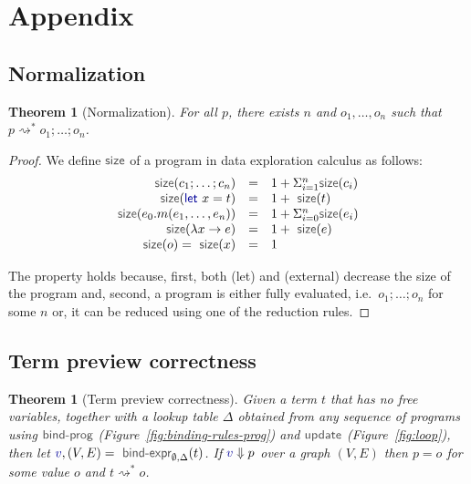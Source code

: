 \documentclass[acmsmall,anonymous,fleqn]{acmart}\settopmatter{printfolios=false,printccs=false,printacmref=false}
\newcounter{thc}
\theoremstyle{plain}
\newtheorem{theorem}[thc]{Theorem}
\theoremstyle{definition}
\newcommand{\ident}[1]{\textnormal{\textcolor{idclr}{\sffamily #1}}}
\newcommand{\kvd}[1]{\textnormal{\textcolor{kvdclr}{\sffamily #1}}}
\newcommand{\bndclr}[1]{\textcolor{kvdclr}{#1}}
\newcommand{\rname}[1]{{\sffamily\small(#1)}}
\begin{document}


\newpage
\appendix

\section{Appendix}

\subsection{Normalization}
\label{sec:app-normalization}

\begin{theorem}[Normalization]
For all $p$, there exists $n$ and $o_1, \ldots, o_n$ such that $p\rightsquigarrow^{*} o_1;\ldots;o_n$.
\end{theorem}
\begin{proof}
We define $\ident{size}$ of a program in data exploration calculus as follows:
\begin{equation}
\begin{array}{rcl}
\ident{size}(c_1; \ldots; c_n) &=& 1 + \Sigma^{n}_{i=1} \ident{size}(c_i)\\
\ident{size}(\kvd{let}~x=t) &=& 1 + \ident{size}(t)\\
\ident{size}(e_0.m(e_1, \ldots, e_n)) &=& 1 + \Sigma^{n}_{i=0} \ident{size}(e_i)\\
\ident{size}(\lambda x\rightarrow e) &=& 1 + \ident{size}(e)\\
\ident{size}(o) = \ident{size}(x) &=& 1\\
\end{array}
\end{equation}

\noindent
The property holds because, first, both \rname{let} and \rname{external} decrease the \ident{size}
of the program and, second, a program is either fully evaluated, i.e.~$o_1;\ldots;o_n$ for some $n$
or, it can be reduced using one of the reduction rules.
\end{proof}


\subsection{Term preview correctness}
\label{sec:app-correctness}

\begin{theorem}[Term preview correctness]
Given a term $t$ that has no free variables, together with a lookup table $\Delta$ obtained
from any sequence of programs using $\ident{bind-prog}$ (Figure~\ref{fig:binding-rules-prog}) and
$\ident{update}$ (Figure~\ref{fig:loop}), then
let $\bndclr{v}, (V, E) = \ident{bind-expr}_{\emptyset, \Delta}(t)$. If $\bndclr{v}\Downarrow p$
over a graph $(V, E)$ then $p = o$ for some value $o$ and $t \rightsquigarrow^{*} o$.
\end{theorem}
\end{document}
